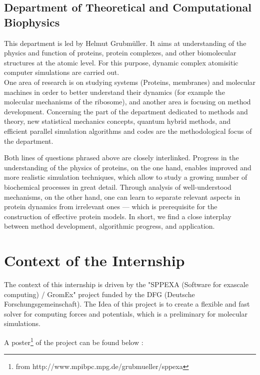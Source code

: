 \documentclass[11pt,twoside,a4paper]{report}
\begin{document}
\section*{Department of Theoretical and Computational Biophysics}

This department is led by Helmut Grubmüller. It aims at understanding of the physics and function of proteins, protein complexes, and other biomolecular structures at the atomic level. For this purpose, dynamic complex atomisitic computer simulations are carried out.\\

One area of research is on studying systems (Proteins, membranes) and molecular machines in order to better understand their dynamics (for example the molecular mechanisms of the ribosome), and another area is focusing on method development.
Concerning the part of the department dedicated to methods and theory, new statistical mechanics concepts, quantum hybrid methods, and efficient parallel simulation algorithms and codes are the methodological focus of the department.

Both lines of questions phrased above are closely interlinked. Progress in the understanding of the physics of proteins, on the one hand, enables improved and more realistic simulation techniques, which allow to study a growing number of biochemical processes in great detail. Through analysis of well-understood mechanisms, on the other hand, one can learn to separate relevant aspects in protein dynamics from irrelevant ones — which is prerequisite for the construction of effective protein models. In short, we find a close interplay between method development, algorithmic progress, and application.  






\chapter{Context of the Internship}

The context of this internship is driven by the "SPPEXA (Software for exascale computing) / GromEx" project funded by the DFG (Deutsche Forschungsgemeinschaft).
The Idea of this project is to create a flexible and fast solver for computing forces and potentials, which is a preliminary for molecular simulations.

A poster\footnote{from http://www.mpibpc.mpg.de/grubmueller/sppexa}   of the project can be found below :
\end{document}
